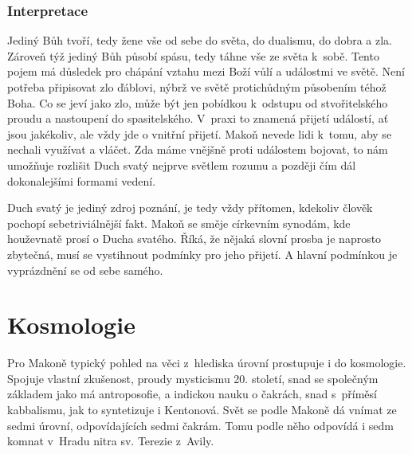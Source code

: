 \subsubsection*{Interpretace}

Jediný Bůh tvoří, tedy žene vše od sebe do světa, do dualismu, do dobra a zla.
Zároveň týž jediný Bůh působí spásu, tedy táhne vše ze světa k~sobě. Tento pojem
má důsledek pro chápání vztahu mezi Boží vůlí a událostmi ve světě. Není potřeba
připisovat zlo ďáblovi, nýbrž ve světě protichůdným působením téhož Boha. Co se
jeví jako zlo, může být jen pobídkou k~odstupu od stvořitelského proudu a
nastoupení do spasitelského. V~praxi to znamená přijetí událostí, ať jsou
jakékoliv, ale vždy jde o vnitřní přijetí. Makoň nevede lidi k~tomu, aby se
nechali využívat a vláčet. Zda máme vnějšně proti událostem bojovat, to nám
umožňuje rozlišit Duch svatý nejprve světlem rozumu a později čím dál
dokonalejšími formami vedení.

Duch svatý je jediný zdroj poznání, je tedy vždy přítomen, kdekoliv člověk
pochopí sebetriviálnější fakt. Makoň se směje
církevním synodám, kde houževnatě prosí o Ducha
svatého. Říká,
že nějaká slovní prosba je naprosto zbytečná, musí se vystihnout podmínky pro
jeho přijetí. A hlavní podmínkou je vyprázdnění se od sebe samého.

\section{Kosmologie}

Pro Makoně typický pohled na věci z~hlediska úrovní prostupuje i do kosmologie.
Spojuje vlastní zkušenost, proudy mysticismu 20. století, snad se společným
základem jako má antroposofie,\cite{Bezdek2009thesis} a indickou nauku o
čakrách,\cite{atwell2013osi} snad s~příměsí kabbalismu, jak to syntetizuje i
Kentonová.\cite{kenton2015kabbalistic} Svět se podle Makoně dá vnímat ze sedmi
úrovní, odpovídajících sedmi čakrám. Tomu podle něho odpovídá i sedm komnat v~Hradu
nitra\cite{teresa1588castillo} sv. Terezie z~Avily.

